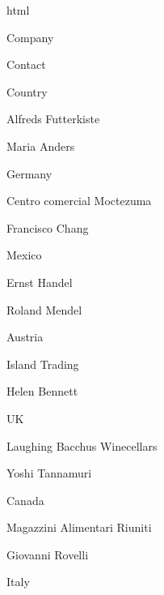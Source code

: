 \documentclass[ignorenonframetext,]{beamer}
\begin{document}
\begin{frame}{html}
\protect\hypertarget{html}{}

Company

Contact

Country

Alfreds Futterkiste

Maria Anders

Germany

Centro comercial Moctezuma

Francisco Chang

Mexico

Ernst Handel

Roland Mendel

Austria

Island Trading

Helen Bennett

UK

Laughing Bacchus Winecellars

Yoshi Tannamuri

Canada

Magazzini Alimentari Riuniti

Giovanni Rovelli

Italy

\end{frame}
\end{document}
